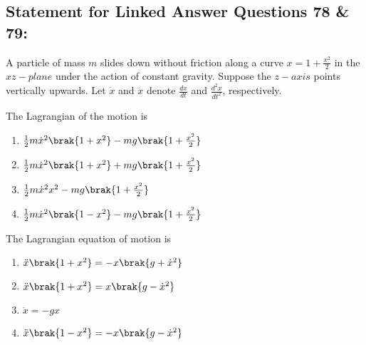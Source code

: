 \subsection*{Statement for Linked Answer Questions 78 \& 79:}
A particle of mass $m$ slides down without friction along a curve $x = 1 + \frac{x^2}{2}$ in the $xz-plane$ under the action of constant gravity. Suppose the $z-axis$ points vertically upwards. Let $\dot{x}$ and $\ddot{x}$ denote $\frac{dx}{dt}$ and $\frac{d^2x}{dt^2}$, respectively.
\item The Lagrangian of the motion is
\begin{multicols}{2}
    \begin{enumerate}
        \item $\frac{1}{2} m\dot{x}^2\brak{1+x^2} - mg\brak{1+\frac{x^2}{2}}$
        \item $\frac{1}{2} m\dot{x}^2\brak{1+x^2} + mg\brak{1+\frac{x^2}{2}}$
        \item $\frac{1}{2} m\dot{x}^2 x^2 - mg\brak{1+\frac{x^2}{2}}$
        \item $\frac{1}{2} m\dot{x}^2\brak{1-x^2} - mg\brak{1+\frac{x^2}{2}}$
    \end{enumerate}
\end{multicols}
\item The Lagrangian equation of motion is
\begin{multicols}{2}
    \begin{enumerate}
        \item $\ddot{x} \brak{1+x^2} = -x\brak{g+\dot{x}^2}$
        \item $\ddot{x} \brak{1+x^2} = x\brak{g-\dot{x}^2}$
        \item $\ddot{x} = - gx$
        \item $\ddot{x} \brak{1-x^2} = -x \brak{g-\dot{x}^2}$
    \end{enumerate}
\end{multicols}

